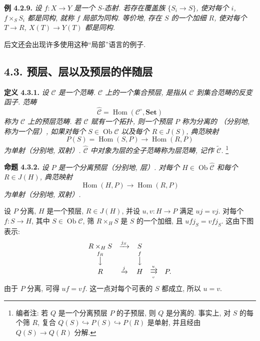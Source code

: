 \medskip
\noindent{}\textbf{例 4.2.9.}
\textit{设 \(f:X\to Y\) 是一个 \(S\)-态射.
若存在覆盖族 \(\{S_i\to S\}\), 使对每个 \(i\),
\(f\times_SS_i\) 都是同构, 就称 \(f\) \emph{局部为同构}.
等价地, 存在 \(S\) 的一个加细 \(R\),
使对每个 \(T\to R\), \(X(T)\to Y(T)\) 都是同构.}

后文还会出现许多使用这种“局部”语言的例子.

\subsection*{4.3. 预层、层以及预层的伴随层}

\medskip
\noindent{}\textbf{定义 4.3.1.}
\textit{设 \(\mathscr C\) 是一个范畴.
\(\mathscr C\) 上的一个\emph{集合预层}, 是指从 \(\mathscr C\) 到集合范畴的反变函子.
范畴}
\[
 \widehat{\mathscr C}
 =\operatorname{Hom}(\mathscr C^{\circ},\mathbf{Set})
\]
\textit{称为 \(\mathscr C\) 上的\emph{预层范畴}.
若 \(\mathscr C\) 赋有一个拓扑, 则一个预层 \(P\) 称为\emph{分离的}
（分别地, 称为一个\emph{层}）, 如果对每个
\(S\in\operatorname{Ob}\mathscr C\) 以及每个 \(R\in J(S)\), 典范映射}
\[
\tag{+}\label{sga3:iv:definition:4:3:1:eq:unnamed:01}
 P(S)=\operatorname{Hom}(S,P)\longrightarrow\operatorname{Hom}(R,P)
\]
\textit{为单射（分别地, 双射）.
\(\widehat{\mathscr C}\) 中对象为层的全子范畴称为\emph{层范畴},
记作 \(\widetilde{\mathscr C}\).}
\footnote{编者注: 若 \(Q\) 是一个分离预层 \(P\) 的子预层,
则 \(Q\) 是分离的. 事实上, 对 \(S\) 的每个筛 \(R\),
复合 \(Q(S)\hookrightarrow P(S)\hookrightarrow P(R)\)
是单射, 并且经由 \(Q(S)\to Q(R)\) 分解.}

\medskip
\noindent{}\textbf{命题 4.3.2.}
\textit{设 \(P\) 是一个分离预层（分别地, 层）.
对每个 \(H\in\operatorname{Ob}\widehat{\mathscr C}\) 和每个
\(R\in J(H)\), 典范映射}
\[
\tag{+}\label{sga3:iv:proposition:4:3:2:eq:unnamed:01}
 \operatorname{Hom}(H,P)\longrightarrow\operatorname{Hom}(R,P)
\]
\textit{为单射（分别地, 双射）.}

设 \(P\) 分离, \(H\) 是一个预层, \(R\in J(H)\),
并设 \(u,v:H\to P\) 满足 \(uj=vj\).
对每个 \(f:S\to H\), 其中 \(S\in\operatorname{Ob}\mathscr C\),
筛 \(R\times_HS\) 是 \(S\) 的一个加细, 且 \(ufj_S=vfj_S\).
这由下图表示:
\[
\begin{array}{ccccc}
 R\times_HS&\xrightarrow{j_S}&S&&\\
 \overset{f_R}{\big\downarrow}&&
 \overset{f}{\big\downarrow}&&\\
 R&\xrightarrow{j}&H&
 \mathrel{\substack{\xrightarrow{u}\\[-0.5ex]\xrightarrow[v]{}}}&P.
\end{array}
\]
由于 \(P\) 分离, 可得 \(uf=vf\).
这一点对每个可表的 \(S\) 都成立, 所以 \(u=v\).

